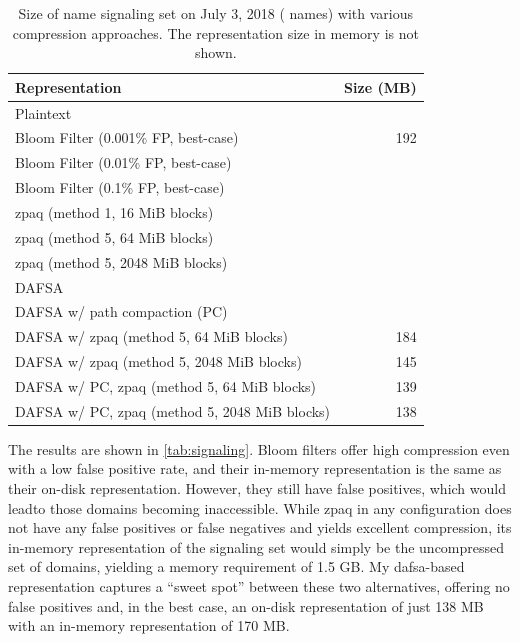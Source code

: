 

\begin{table}[t]
  \centering
  \caption{Size of \ac{name} signaling set on
    July 3, 2018 (\numnames{} names) with various compression approaches. The
    representation size in memory is not shown.}
  \begin{tabularx}{\linewidth}{|Xr|}
    \toprule
    \textbf{Representation} & \textbf{Size (MB)} \\
    \midrule
    Plaintext & \plaintextsize \\
    \midrule
    Bloom Filter (0.001\% FP, best-case) & 192 \\
    Bloom Filter (0.01\% FP, best-case) & \bloomlargesize \\
    Bloom Filter (0.1\% FP, best-case) & \bloommedsize \\
    \midrule
    zpaq (method 1, 16 MiB blocks) & \zpaqlargesize \\
    zpaq (method 5, 64 MiB blocks) & \zpaqmedsize \\
    zpaq (method 5, 2048 MiB blocks) & \zpaqsmallsize \\
    \midrule
    DAFSA & \fsalargesize \\
    DAFSA w/ path compaction (PC) & \fsamedsize \\
    DAFSA w/ zpaq (method 5, 64 MiB blocks) & 184 \\
    DAFSA w/ zpaq (method 5, 2048 MiB blocks) & 145 \\
    DAFSA w/ PC, zpaq (method 5, 64 MiB blocks) & 139 \\
    DAFSA w/ PC, zpaq (method 5, 2048 MiB blocks) & 138 \\    
    \bottomrule
  \end{tabularx}
  \label{tab:signaling}
\end{table}

The results are shown in \autoref{tab:signaling}. Bloom filters offer high
compression even with a low false positive rate, and their in-memory
representation is the same as their on-disk representation. However, they still
have false positives, which would leadto those domains becoming inaccessible.
While zpaq in any configuration does not have any false positives or false
negatives and yields excellent compression, its in-memory representation of the
signaling set would simply be the uncompressed set of domains, yielding a memory
requirement of 1.5 GB. My \ac{dafsa}-based representation captures a ``sweet
spot'' between these two alternatives, offering no false positives and, in the
best case, an on-disk representation of just 138 MB with an in-memory
representation of 170 MB.

